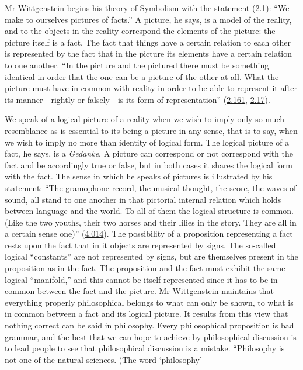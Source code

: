 \documentclass[12pt,oneside]{book}[2007/10/19]
\newcommand{\PropERef}[1]{\hyperref[PropE:#1]{#1}}
\newcommand{\German}[1]{\foreignlanguage{german}{\emph{#1}}}
\begin{document}
Mr Wittgenstein begins his theory of Symbolism with
the statement (\PropERef{2.1}): ``We make to ourselves pictures of
facts.'' A picture, he says, is a model of the reality, and
to the objects in the reality correspond the elements of
the picture: the picture itself is a fact. The fact that
things have a certain relation to each other is represented
by the fact that in the picture its elements have a certain
relation to one another. ``In the picture and the pictured
there must be something identical in order that the one
can be a picture of the other at all. What the picture
must have in common with reality in order to be able
to represent it after its manner---rightly or falsely---is its
form of representation'' (\PropERef{2.161}, \PropERef{2.17}).

We speak of a logical picture of a reality when we
wish to imply only so much resemblance as is essential to
its being a picture in any sense, that is to say, when we
wish to imply no more than identity of logical form.
The logical picture of a fact, he says, is a \German{Gedanke}. A
picture can correspond or not correspond with the fact and
be accordingly true or false, but in both cases it shares the
logical form with the fact. The sense in which he speaks of
pictures is illustrated by his statement: ``The gramophone
record, the musical thought, the score, the waves of sound,
all stand to one another in that pictorial internal relation
which holds between language and the world. To all of
them the logical structure is common. (Like the two
youths, their two horses and their lilies in the story.
They are all in a certain sense one)'' (\PropERef{4.014}). The
possibility of a proposition representing a fact rests upon
the fact that in it objects are represented by signs. The
so-called logical ``constants'' are not represented by signs,
but are themselves present in the proposition as in the
fact. The proposition and the fact must exhibit the same
logical ``manifold,'' and this cannot be itself represented
since it has to be in common between the fact and
the picture. Mr Wittgenstein maintains that everything
properly philosophical belongs to what can only be shown,
to what is in common between a fact and its logical
picture. It results from this view that nothing correct can
be said in philosophy. Every philosophical proposition
is bad grammar, and the best that we can hope to achieve
by philosophical discussion is to lead people to see that
philosophical discussion is a mistake. ``Philosophy is
not one of the natural sciences. (The word `philosophy'
\end{document}
